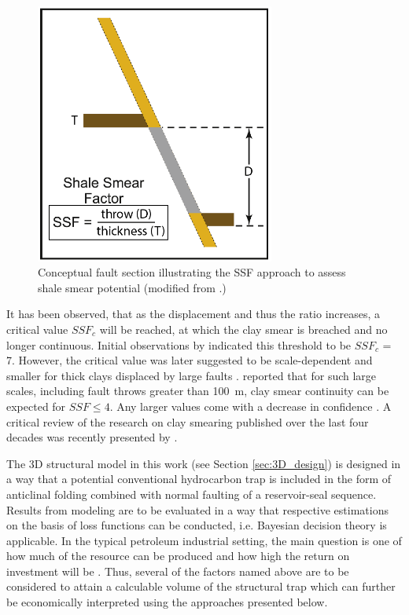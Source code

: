 		\begin{figure}[h]
			\centering
			\includegraphics[width=0.7\textwidth]{Figures/SSF.PNG}
			\caption{Conceptual fault section illustrating the SSF approach to assess shale smear potential (modified from \citet{vrolijk2016clay}.)}\label{fig:ssf}
		\end{figure}
		It has been observed, that as the displacement and thus the ratio increases, a critical value $SSF_c$ will be reached, at which the clay smear is breached and no longer continuous. Initial observations by \citet{lindsay1993outcrop} indicated this threshold to be $SSF_c$ = 7. However, the critical value was later suggested to be scale-dependent and smaller for thick clays displaced by large faults \citep{yielding2012using}. \citet{faerseth2006shale} reported that for such large scales, including fault throws greater than 100~m, clay smear continuity can be expected for $SSF\le4$. Any larger values come with a decrease in confidence \citep{faerseth2006shale}. A critical review of the research on clay smearing published over the last four decades was recently presented by \citet{vrolijk2016clay}.
			
        The 3D structural model in this work (see Section \ref{sec:3D_design}) is designed in a way that a potential conventional hydrocarbon trap is included in the form of anticlinal folding combined with normal faulting of a reservoir-seal sequence. Results from modeling are to be evaluated in a way that respective estimations on the basis of loss functions can be conducted, i.e. Bayesian decision theory is applicable. In the typical petroleum industrial setting, the main question is one of how much of the resource can be produced and how high the return on investment will be \citep{dean2007volumetric}. Thus, several of the factors named above are to be considered to attain a calculable volume of the structural trap which can further be economically interpreted using the approaches presented below.
        
